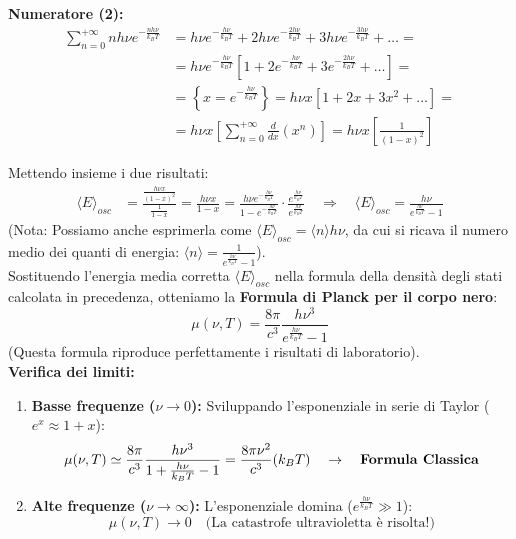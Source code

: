 \documentclass[11pt, a4paper]{article}
\begin{document}
\textbf{Numeratore (2):} %
\begin{align*}
    \sum_{n=0}^{+\infty} n h \nu e^{-\frac{n h \nu}{k_B T}} &= h\nu e^{-\frac{h\nu}{k_B T}} + 2h\nu e^{-\frac{2h\nu}{k_B T}} + 3h\nu e^{-\frac{3h\nu}{k_B T}} + \dots = \\
    &= h\nu e^{-\frac{h\nu}{k_B T}} \left[ 1 + 2e^{-\frac{h\nu}{k_B T}} + 3e^{-\frac{2h\nu}{k_B T}} + \dots \right] = \\
    &= \left\{ x = e^{-\frac{h\nu}{k_B T}} \right\} = h\nu x [1 + 2x + 3x^2 + \dots] = \\
    &= h\nu x \left[ \sum_{n=0}^{+\infty} \frac{d}{dx}(x^n) \right] = h\nu x \left[ \frac{1}{(1-x)^2} \right] %
\end{align*}

Mettendo insieme i due risultati: %
\begin{align*}
    \langle E \rangle_{osc} &= \frac{\frac{h\nu x}{(1-x)^2}}{\frac{1}{1-x}} = \frac{h\nu x}{1-x} = \frac{h\nu e^{-\frac{h\nu}{k_B T}}}{1 - e^{-\frac{h\nu}{k_B T}}} \cdot \frac{e^{\frac{h\nu}{k_B T}}}{e^{\frac{h\nu}{k_B T}}} \quad \Rightarrow \quad \boxed{ \langle E \rangle_{osc} = \frac{h\nu}{e^{\frac{h\nu}{k_B T}} - 1} } %
\end{align*}
(Nota: Possiamo anche esprimerla come $\langle E \rangle_{osc} = \langle n \rangle h\nu$, da cui si ricava il numero medio dei quanti di energia: $\langle n \rangle = \frac{1}{e^{\frac{h\nu}{k_B T}} - 1}$). \\

\noindent
Sostituendo l'energia media corretta $\langle E \rangle_{osc}$ nella formula della densità degli stati calcolata in precedenza, otteniamo la \textbf{Formula di Planck per il corpo nero}: %
\begin{equation}
    \boxed{ \mu(\nu, T) = \frac{8\pi}{c^3} \frac{h\nu^3}{e^{\frac{h\nu}{k_B T}} - 1} } %
\end{equation}
(Questa formula riproduce perfettamente i risultati di laboratorio). \\

\noindent
\textbf{Verifica dei limiti:} %
\begin{enumerate}
    \item \textbf{Basse frequenze ($\nu \to 0$):} Sviluppando l'esponenziale in serie di Taylor ($e^x \approx 1 + x$): %
    \begin{equation*}
        \mu(\nu, T) \simeq \frac{8\pi}{c^3} \frac{h\nu^3}{1 + \frac{h\nu}{k_B T} - 1} = \frac{8\pi \nu^2}{c^3} (k_B T) \quad \rightarrow \quad \text{\textbf{Formula Classica}} %
    \end{equation*}
    \item \textbf{Alte frequenze ($\nu \to \infty$):} L'esponenziale domina ($e^{\frac{h\nu}{k_B T}} \gg 1$): %
    \begin{equation*}
        \mu(\nu, T) \to 0 \quad \text{(La catastrofe ultravioletta è risolta!)} %
    \end{equation*}
\end{enumerate}
\end{document}
